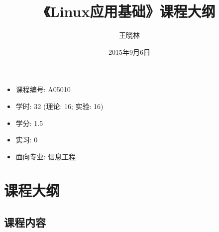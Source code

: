 \documentclass[12pt,a4paper]{article}
\title{《Linux应用基础》课程大纲}
\author{王晓林}
\date{2015年9月6日}
\begin{document}
\maketitle

\begin{itemize}
\item 课程编号: A05010
\item 学时: 32 (理论: 16; 实验: 16)
\item 学分: 1.5
\item 实习: 0
\item 面向专业: 信息工程
\end{itemize}

\tableofcontents
\clearpage

\section{课程大纲}

\subsection{课程内容}
\end{document}

